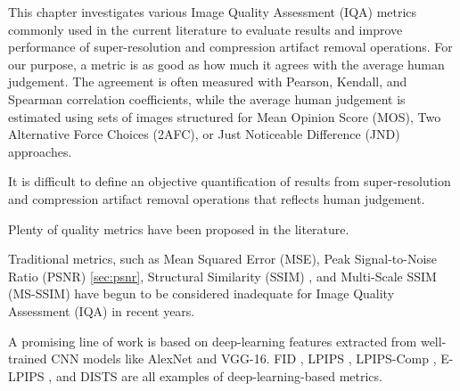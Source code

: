 \label{chap:Metrics}




This chapter investigates various Image Quality Assessment (IQA) metrics commonly used in the current literature to evaluate results and improve performance of super-resolution and compression artifact removal operations.
For our purpose, a metric is as good as how much it agrees with the average human judgement.
The agreement is often measured with Pearson, Kendall, and Spearman correlation coefficients, while the average human judgement is estimated using sets of images structured for Mean Opinion Score (MOS), Two Alternative Force Choices (2AFC), or Just Noticeable Difference (JND) approaches.


It is difficult to define an objective quantification of results from super-resolution and compression artifact removal operations that reflects human judgement.

Plenty of quality metrics have been proposed in the literature.

Traditional metrics, such as Mean Squared Error (MSE), Peak Signal-to-Noise Ratio (PSNR) \ref{sec:psnr}, Structural Similarity (SSIM) \cite{wang2004image}, and Multi-Scale SSIM (MS-SSIM) \cite{wang2003multiscale} have begun to be considered inadequate for Image Quality Assessment (IQA) in recent years.

A promising line of work is based on deep-learning features extracted from well-trained CNN models like AlexNet and VGG-16.
FID \cite{heusel2017gans}, LPIPS \cite{zhang2018unreasonable}, LPIPS-Comp \cite{patel2021saliency}, E-LPIPS \cite{kettunen2019lpips}, and DISTS \cite{ding2020image} are all examples of deep-learning-based metrics.

